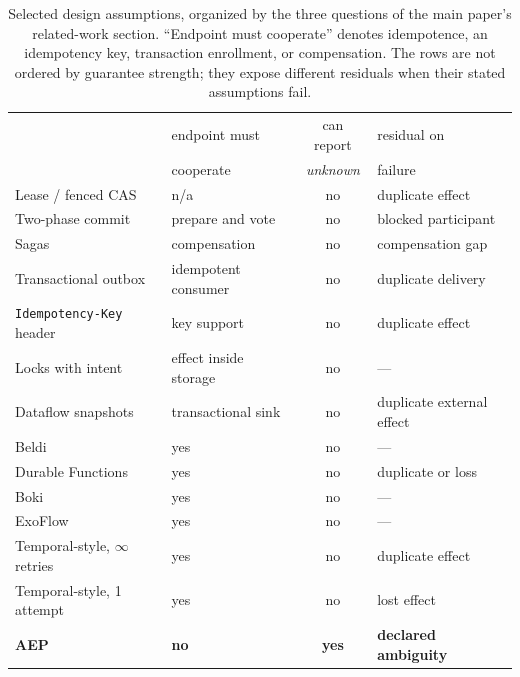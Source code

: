\documentclass[10pt,journal,compsoc]{IEEEtran}
\begin{document}
\begin{table}[h]
\centering
\caption{Selected design assumptions, organized by the three questions of the
main paper's related-work section. ``Endpoint must cooperate'' denotes
idempotence, an idempotency key, transaction enrollment, or compensation. The
rows are not ordered by guarantee strength; they expose different residuals when
their stated assumptions fail.}
\label{supp:tab:related}
\small
\renewcommand{\arraystretch}{1.08}
\begin{tabularx}{\textwidth}{@{}>{\raggedright\arraybackslash}X>{\raggedright\arraybackslash}p{}c>{\raggedright\arraybackslash}p{}@{}}
\toprule
 & endpoint must & can report & residual on \\
 & cooperate & \emph{unknown} & failure \\
\midrule
Lease / fenced CAS~\cite{gray1989leases,kleppmann2016locking}
  & n/a & no & duplicate effect \\
Two-phase commit~\cite{skeen1981nonblocking,mohan1986rstar}
  & prepare and vote & no & blocked participant \\
Sagas~\cite{garciamolina1987sagas,korth1990compensating}
  & compensation & no & compensation gap \\
Transactional outbox~\cite{richardson-transactional-outbox}
  & idempotent consumer & no & duplicate delivery \\
\texttt{Idempotency-Key} header~\cite{jena2025idempotencykey}
  & key support & no & duplicate effect \\
Locks with intent~\cite{setty2016olive}
  & effect inside storage & no & --- \\
Dataflow snapshots~\cite{chandy1985snapshots,carbone2015abs}
  & transactional sink & no & duplicate external effect \\
Beldi~\cite{zhang2020beldi}
  & yes & no & --- \\
Durable Functions~\cite{burckhardt2021durable}
  & yes & no & duplicate or loss \\
Boki~\cite{jia2021boki}
  & yes & no & --- \\
ExoFlow~\cite{zhuang2023exoflow}
  & yes & no & --- \\
Temporal-style, $\infty$ retries~\cite{temporal-retry}
  & yes & no & duplicate effect \\
Temporal-style, 1 attempt~\cite{temporal-retry}
  & yes & no & lost effect \\
\midrule
\textbf{AEP} & \textbf{no} & \textbf{yes} & \textbf{declared ambiguity} \\
\bottomrule
\end{tabularx}
\end{table}
\end{document}
